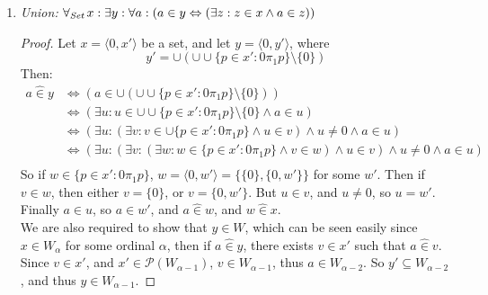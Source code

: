 \documentclass[11pt]{report}
\newcommand{\all}[1]{\forall_{\mathit{#1}}\hspace{0.5mm}}
\newcommand{\pleft}{\mathrel{\pi_1}}
\newcommand{\pright}{\mathrel{\pi_2}}
\newcommand{\pair}[2]{\langle #1,#2 \rangle}
\newcommand{\zin}{\mathrel{\widehat{\in}}}
\newcommand{\zpright}{\mathrel{\widehat{\pi}_2}}
\newcommand{\zpleft}{\mathrel{\widehat{\pi}_1}}
\theoremstyle{definition}
\theoremstyle{theorem}
\theoremstyle{lemma}
\begin{document}
\begin{enumerate}[resume=axiomlist, label=\Roman*.]
  \begin{enumerate}[resume=sublist,label=(\roman*)]
    \item \textit{Pairs:}
    $\forall a,b: (\exists p: a\pleft p \wedge b\pright p)$
  \end{enumerate}
  \begin{proof}
  Let $a,b\in W$ , then $a,b\in W_\alpha$ for some ordinal $\alpha$.
  Now let $p = \pair{1}{p'}$ where $p'=\pair{a}{b} \in W_\alpha^2$, and so $p\in W_{\alpha+1}$, and $a\zpleft p$, $b\zpright p$.
  \end{proof}

\item \textit{Union:}
      $\all{Set} x: \exists y: \forall a: (a\in y \Leftrightarrow (\exists z: z\in x \wedge a\in z))$
\begin{proof}
  Let $x=\pair{0}{x'}$ be a set, and let $y=\pair{0}{y'}$, where $$y'=\cup(\cup\cup \{p\in x' : 0\pleft p\} \setminus \{0\})$$
  Then:
  \begin{align*}
    a\zin y &\iff (a\in \cup(\cup\cup \{p\in x' : 0\pleft p\} \setminus \{0\})) \\
    &\iff (\exists u: u\in \cup\cup \{p\in x' : 0\pleft p\} \setminus \{0\} \wedge a\in u) \\
    &\iff (\exists u: (\exists v: v \in \cup \{p\in x' : 0\pleft p\} \wedge u \in v) \wedge u \neq 0 \wedge a\in u) \\
    &\iff (\exists u: (\exists v: (\exists w: w\in\{p\in x' : 0\pleft p\}\wedge v \in w) \wedge u \in v) \wedge u \neq 0 \wedge a\in u)\\
  \end{align*}
  So if $w\in\{p\in x' : 0\pleft p\}$, $w=\pair{0}{w'}=\{\{0\},\{0,w'\}\}$ for some $w'$.
  Then if $v\in w$, then either $v=\{0\}$, or $v=\{0,w'\}$.
  But $u\in v$, and $u\neq 0$, so $u=w'$.
  Finally $a\in u$, so $a\in w'$, and $a \zin w$, and $w \zin x$.\\

  We are also required to show that $y\in W$, which can be seen easily since $x\in W_\alpha$ for some ordinal $\alpha$, then if $a\zin y$, there exists $v\in x'$ such that $a\zin v$.
  Since $v\in x'$, and $x'\in\mathcal{P}(W_{\alpha-1})$, $v\in W_{\alpha-1}$, thus $a\in W_{\alpha-2}$.
  So $y'\subseteq W_{\alpha-2}$, and thus $y \in W_{\alpha-1}$.
\end{proof}


\end{enumerate}
\end{document}
